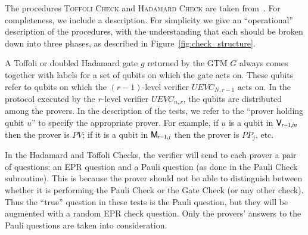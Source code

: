 The procedures  \textsc{Toffoli Check} and \textsc{Hadamard Check} are taken from~\cite{ji2016compression}. For completeness, we include a description. For simplicity we give an ``operational'' description of the procedures, with the understanding that each should be broken down into three phases, as described in Figure~\ref{fig:check_structure}.

A Toffoli or doubled Hadamard gate $g$ returned by the GTM $G$ always comes together with labels for a set of qubits on which the gate acts on. These qubits refer to qubits on which the $(r-1)$-level verifier $UEVC_{N,r-1}$ acts on. In the protocol executed by the $r$-level verifier $UEVC_{n,r}$, the qubits are distributed among the provers. In the description of the tests, we refer to the ``prover holding qubit $u$'' to specify the appropriate prover. For example, if $u$ is a qubit in ${\textsf{V}}_{r-1,in}$ then the prover is $PV$; if it is a qubit in ${\textsf{M}}_{r-1,j}$ then the prover is $PP_j$, etc. 

In the Hadamard and Toffoli Checks, the verifier will send to each prover a pair of questions: an EPR question and a Pauli question (as done in the Pauli Check subroutine). This is because the prover should not be able to distinguish between whether it is performing the Pauli Check or the Gate Check (or any other check). Thus the ``true'' question in these tests is the Pauli question, but they will be augmented with a random EPR check question. Only the provers' answers to the Pauli questions are taken into consideration.

